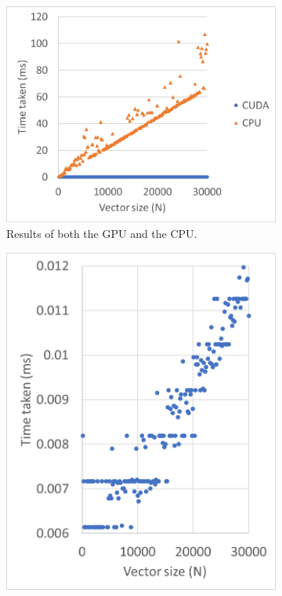 \documentclass[12pt, twocolumn]{report}
\begin{document}
\begin{figure}[htbp]
    \centering
    \begin{subfigure}{0.7\textwidth}
        \centering
        \includegraphics[width=1\textwidth]{Figures/Test vector addition GPU and CPU.png}
        \caption{Results of both the GPU and the CPU.}
        \label{Test vector addition GPU and CPU}
    \end{subfigure}
    \begin{subfigure}{0.45\textwidth}
        \centering
        \includegraphics[width=1\textwidth]{Figures/Test vector addition GPU.png}

\end{subfigure}
\end{figure}
\end{document}
